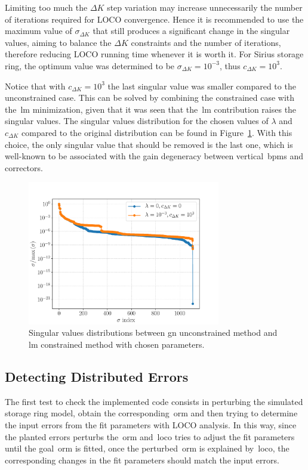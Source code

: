 Limiting too much the $\Delta K$ step variation may increase unnecessarily the number of iterations required for LOCO convergence. Hence it is recommended to use the maximum value of $\sigma_{\Delta K}$ that still produces a significant change in the singular values, aiming to balance the $\Delta K$ constraints and the number of iterations, therefore reducing LOCO running time whenever it is worth it. For Sirius storage ring, the optimum value was determined to be $\sigma_{\Delta K} = 10^{-3}$, thus $c_{\Delta K} = 10^{3}$.

Notice that with $c_{\Delta K}=10^{3}$ the last singular value was smaller compared to the unconstrained case. This can be solved by combining the constrained case with the~\gls{lm} minimization, given that it was seen that the~\gls{lm} contribution raises the singular values. The singular values distribution for the chosen values of $\lambda$ and $c_{\Delta K}$ compared to the original distribution can be found in Figure~\ref{fig:compare_svs}. With this choice, the only singular value that should be removed is the last one, which is well-known to be associated with the gain degeneracy between vertical~\glspl{bpm} and correctors.
\begin{figure}
\centering
\includegraphics[width=0.75\textwidth]{figures/chosen_singular_values.pdf}
\caption{Singular values distributions between \gls{gn} unconstrained method and \gls{lm} constrained method with chosen parameters.}
\label{fig:compare_svs}
\end{figure}

\subsection{Detecting Distributed Errors}
The first test to check the implemented code consists in perturbing the simulated storage ring model, obtain the corresponding~\gls{orm} and then trying to determine the input errors from the fit parameters with LOCO analysis. In this way, since the planted errors perturbs the~\gls{orm} and~\gls{loco} tries to adjust the fit parameters until the goal~\gls{orm} is fitted, once the perturbed~\gls{orm} is explained by~\gls{loco}, the corresponding changes in the fit parameters should match the input errors. 

